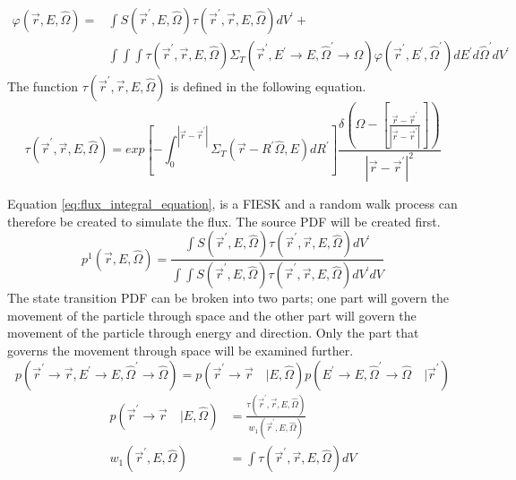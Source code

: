 \begin{equation}
  \begin{split}
    \varphi(\vec{r},E,\hat{\Omega}) = & \int S(\vec{r}^{'},E,\hat{\Omega})
    \tau(\vec{r}^{'},\vec{r},E,\hat{\Omega}) dV^{'} + \\
    & \int\int\int \tau(\vec{r}^{'},\vec{r},E,\hat{\Omega})
    \Sigma_T(\vec{r}^{'},E^{'} \to E, \hat{\Omega}^{'} \to \hat{\Omega})
    \varphi(\vec{r}^{'},E^{'},\hat{\Omega}^{'}) dE^{'} d\hat{\Omega}^{'} dV^{'}
  \end{split}
  \label{eq:flux_integral_equation}
\end{equation}
The function $\tau(\vec{r}^{'},\vec{r},E,\hat{\Omega})$ is defined in the following 
equation.
\begin{equation}
  \tau(\vec{r}^{'},\vec{r},E,\hat{\Omega}) = 
  exp\left[-\int_0^{|\vec{r} - \vec{r}^{'}|} 
              \Sigma_T(\vec{r}-R^{'}\hat{\Omega},E)dR^{'} \right]
    \frac{\delta \left(\Omega - \left[\frac{\vec{r} - \vec{r}^{'}}
        {|\vec{r} - \vec{r}^{'}|}\right]\right)} 
    {|\vec{r} - \vec{r}^{'}|^2}
  \label{eq:unnormalized_transport_kernel}
\end{equation}

Equation \ref{eq:flux_integral_equation}, is a FIESK and a random walk process 
can therefore be created to simulate the flux. The source PDF will be created 
first. 
\begin{equation}
  p^1(\vec{r},E,\hat{\Omega}) = \frac{\int S(\vec{r}^{'},E,\hat{\Omega})
    \tau(\vec{r}^{'},\vec{r},E,\hat{\Omega}) dV^{'}}{\int\int S(\vec{r}^{'},E,\hat{\Omega})
    \tau(\vec{r}^{'},\vec{r},E,\hat{\Omega}) dV^{'} dV}
\end{equation}
The state transition PDF can be broken into two parts; one part will govern the
movement of the particle through space and the other part will govern the 
movement of the particle through energy and direction. Only the part that
governs the movement through space will be examined further.
\begin{equation}
  p(\vec{r}^{'} \to \vec{r}, E^{'} \to E, \hat{\Omega}^{'} \to \hat{\Omega}) =
  p(\vec{r}^{'} \to \vec{r}\quad| E,\hat{\Omega})
  p(E^{'} \to E, \hat{\Omega}^{'} \to \hat{\Omega}\quad|\vec{r}^{'})
\end{equation}
\begin{align}
  p(\vec{r}^{'} \to \vec{r} \quad | E,\hat{\Omega}) & =
  \frac{\tau(\vec{r}^{'},\vec{r},E,\hat{\Omega})}{w_1(\vec{r}^{'},E,\hat{\Omega})}  \\
  w_1(\vec{r}^{'},E,\hat{\Omega}) & = \int \tau(\vec{r}^{'},\vec{r},E,\hat{\Omega}) dV 
\end{align}

